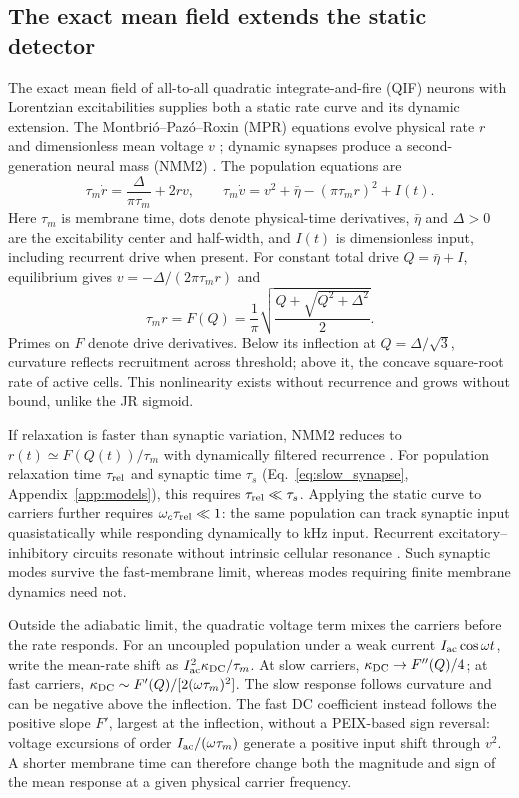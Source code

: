 \documentclass[11pt,a4paper]{article}
\begin{document}
\subsection{The exact mean field extends the static detector}\label{sec:dynamic}
The exact mean field of all-to-all quadratic integrate-and-fire (QIF) neurons
with Lorentzian excitabilities supplies both a static rate curve and its
dynamic extension. The Montbri\'o--Paz\'o--Roxin (MPR) equations evolve physical
rate $r$ and dimensionless mean voltage $v$ \cite{montbrio2015}; dynamic
synapses produce a second-generation neural mass (NMM2)
\cite{ruffini2021nmm2,clusella2023}. The population equations are
\begin{equation}
\tau_m\dot r=\frac{\Delta}{\pi\tau_m}+2rv,\qquad
\tau_m\dot v=v^2+\bar\eta-(\pi\tau_m r)^2+I(t).
\label{eq:mpr}
\end{equation}
Here $\tau_m$ is membrane time, dots denote physical-time derivatives,
$\bar\eta$ and $\Delta>0$ are the excitability center and half-width, and
$I(t)$ is dimensionless input, including recurrent drive when present.
For constant total drive $Q=\bar\eta+I$, equilibrium gives
$v=-\Delta/(2\pi\tau_m r)$ and
\begin{equation}
\tau_m r=F(Q)=\frac{1}{\pi}\sqrt{\frac{Q+\sqrt{Q^2+\Delta^2}}{2}} .
\label{eq:Fmpr}
\end{equation}
Primes on $F$ denote drive derivatives. Below its inflection at
$Q=\Delta/\sqrt3$, curvature reflects recruitment across threshold;
above it, the concave square-root rate of active cells. This nonlinearity
exists without recurrence and grows without bound, unlike the JR sigmoid.

If relaxation is faster than synaptic variation, NMM2 reduces to
$r(t)\simeq F(Q(t))/\tau_m$ with dynamically filtered recurrence
\cite{ruffini2021nmm2,clusella2023}. For population relaxation time
$\tau_{\rm rel}$ and synaptic time $\tau_s$ (Eq.~\eqref{eq:slow_synapse},
Appendix~\ref{app:models}), this requires $\tau_{\rm rel}\ll\tau_s$.
Applying the static curve to carriers further requires
$\omega_c\tau_{\rm rel}\ll1$: the same population can track synaptic
input quasistatically while responding dynamically to kHz input.
Recurrent excitatory--inhibitory circuits resonate without intrinsic
cellular resonance \cite{brunelhakim1999,brunelwang2003}. Such synaptic
modes survive the fast-membrane limit, whereas modes requiring finite
membrane dynamics need not.

Outside the adiabatic limit, the quadratic voltage term mixes the carriers
before the rate responds. For an uncoupled population under a weak current
$I_{\rm ac}\cos\omega t$, write the mean-rate shift as
$I_{\rm ac}^2\kappa_{\rm DC}/\tau_m$. At slow carriers,
$\kappa_{\rm DC}\to F''(Q)/4$; at fast carriers,
$\kappa_{\rm DC}\sim F'(Q)/[2(\omega\tau_m)^2]$.
The slow response follows curvature and can be negative above the inflection.
The fast DC coefficient instead follows the positive slope $F'$, largest at the
inflection, without a PEIX-based sign reversal: voltage excursions of order
$I_{\rm ac}/(\omega\tau_m)$ generate a positive input shift through $v^2$.
A shorter membrane time can therefore change both the magnitude and sign
of the mean response at a given physical carrier frequency.
\end{document}

